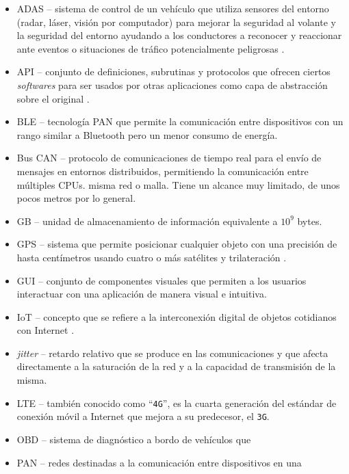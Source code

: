 \begin{itemize}
  \item \ac{ADAS} -- sistema de control de un vehículo que utiliza sensores del entorno
        (radar, láser, visión por computador) para mejorar la seguridad al volante y
        la seguridad del entorno ayudando a los conductores a reconocer y reaccionar
        ante eventos o situaciones de tráfico potencialmente peligrosas \cite{hermawanAcquisitionModelingEvaluating2020}.
  \item \ac{API} -- conjunto de definiciones, subrutinas y protocolos que ofrecen
        ciertos \textit{softwares} para ser usados por otras aplicaciones como
        capa de abstracción sobre el original \cite{InterfazProgramacionAplicaciones2021}.
  \item \ac{BLE} -- tecnología \ac{PAN} que permite la comunicación entre dispositivos
        con un rango similar a Bluetooth pero un menor consumo de energía.
  \item Bus \ac{CAN} -- protocolo de comunicaciones de tiempo real para el envío de
        mensajes en entornos distribuidos, permitiendo la comunicación
        entre múltiples CPUs.
        misma red o malla. Tiene un alcance muy limitado, de unos pocos metros por
        lo general.
  \item \ac{GB} -- unidad de almacenamiento de información equivalente a $10^9$ bytes.
  \item \ac{GPS} -- sistema que permite posicionar cualquier objeto con una 
        precisión de hasta centímetros usando cuatro o más satélites y 
        trilateración \cite{GPS2021}.
  \item \ac{GUI} -- conjunto de componentes visuales que permiten a los usuarios
        interactuar con una aplicación de manera visual e intuitiva.
  \item \ac{IoT} -- concepto que se refiere a la interconexión digital de objetos 
        cotidianos con Internet \cite{InternetCosas2021}.
  \item \textit{jitter} -- retardo relativo que se produce en las comunicaciones
        y que afecta directamente a la saturación de la red y a la capacidad de
        transmisión de la misma.
  \item \ac{LTE} -- también conocido como ``\texttt{4G}'', es la cuarta generación
        del estándar de conexión móvil a Internet que mejora a su predecesor, el \texttt{3G}.
  \item \ac{OBD} -- sistema de diagnóstico a bordo de vehículos que
  \item \ac{PAN} -- redes destinadas a la comunicación entre dispositivos en una

\end{itemize}

